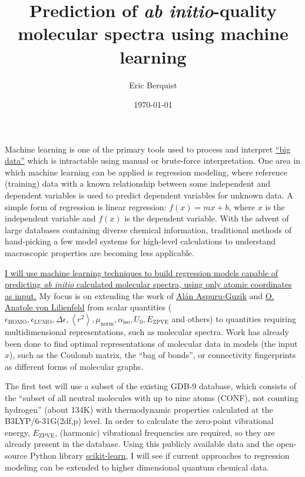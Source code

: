 \documentclass[11pt]{article}
\title{Prediction of \textit{ab initio}-quality molecular spectra using machine learning}
\author{Eric Berquist}
\date{\today}
\begin{document}
\maketitle

Machine learning is one of the primary tools used to process and interpret \href{https://en.wikipedia.org/wiki/Big_data}{``big data''} which is intractable using manual or brute-force interpretation. One area in which machine learning can be applied is regression modeling, where reference (training) data with a known relationship between some independent and dependent variables is used to predict dependent variables for unknown data. A simple form of regression is linear regression: \(f(x) = mx + b\), where \(x\) is the independent variable and \(f(x)\) is the dependent variable. With the advent of large databases containing diverse chemical information, traditional methods of hand-picking a few model systems for high-level calculations to understand macroscopic properties are becoming less applicable.

\ul{I will use machine learning techniques to build regression models capable of predicting \textit{ab initio} calculated molecular spectra, using only atomic coordinates as input.} My focus is on extending the work of \href{http://aspuru.chem.harvard.edu/}{Al\'{a}n Aspuru-Guzik} and \href{http://www.chemie.unibas.ch/~anatole/}{O. Anatole von Lilienfeld} from scalar quantities (\(\epsilon_{\text{HOMO}}, \epsilon_{\text{LUMO}}, \Delta\epsilon, \left<r^2\right>, \mu_{\text{norm}}, \alpha_{\text{iso}}, U_{0}, E_{\text{ZPVE}}\) and others) to quantities requiring multidimensional representations, such as molecular spectra. Work has already been done to find optimal representations of molecular data in models (the input \(x\)), such as the Coulomb matrix, the ``bag of bonds'', or connectivity fingerprints as different forms of molecular graphs.

The first test will use a subset of the existing GDB-9 database, which consists of the ``subset of all neutral molecules with up to nine atoms (CONF), not counting hydrogen'' (about 134K) with thermodynamic properties calculated at the B3LYP/6-31G(2df,p) level. In order to calculate the zero-point vibrational energy, \(E_{\text{ZPVE}}\), (harmonic) vibrational frequencies are required, so they are already present in the database. Using this publicly available data and the open-source Python library \href{http://scikit-learn.org/stable/}{scikit-learn}, I will see if current approaches to regression modeling can be extended to higher dimensional quantum chemical data.
\end{document}
